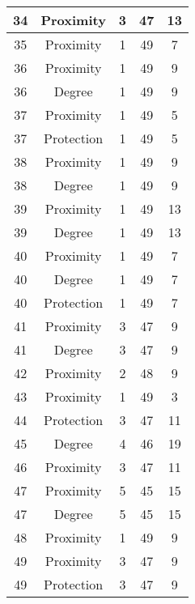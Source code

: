 \documentclass[results.tex]{subfiles}
\begin{document}
\begin{center}
\begin{tabular}{| c || c | c | c | c |}
    34 & Proximity & 3 & 47 & 13 \\ 
    \hline
    35 & Proximity & 1 & 49 & 7 \\ 
    \hline
    36 & Proximity & 1 & 49 & 9 \\ 
    \hline
    36 & Degree & 1 & 49 & 9 \\ 
    \hline
    37 & Proximity & 1 & 49 & 5 \\ 
    \hline
    37 & Protection & 1 & 49 & 5 \\ 
    \hline
    38 & Proximity & 1 & 49 & 9 \\ 
    \hline
    38 & Degree & 1 & 49 & 9 \\ 
    \hline
    39 & Proximity & 1 & 49 & 13 \\ 
    \hline
    39 & Degree & 1 & 49 & 13 \\ 
    \hline
    40 & Proximity & 1 & 49 & 7 \\ 
    \hline
    40 & Degree & 1 & 49 & 7 \\ 
    \hline
    40 & Protection & 1 & 49 & 7 \\ 
    \hline
    41 & Proximity & 3 & 47 & 9 \\ 
    \hline
    41 & Degree & 3 & 47 & 9 \\ 
    \hline
    42 & Proximity & 2 & 48 & 9 \\ 
    \hline
    43 & Proximity & 1 & 49 & 3 \\ 
    \hline
    44 & Protection & 3 & 47 & 11 \\ 
    \hline
    45 & Degree & 4 & 46 & 19 \\ 
    \hline
    46 & Proximity & 3 & 47 & 11 \\ 
    \hline
    47 & Proximity & 5 & 45 & 15 \\ 
    \hline
    47 & Degree & 5 & 45 & 15 \\ 
    \hline
    48 & Proximity & 1 & 49 & 9 \\ 
    \hline
    49 & Proximity & 3 & 47 & 9 \\ 
    \hline
    49 & Protection & 3 & 47 & 9 \\ 
    \hline   \end{tabular}
\end{center}
\end{document}
